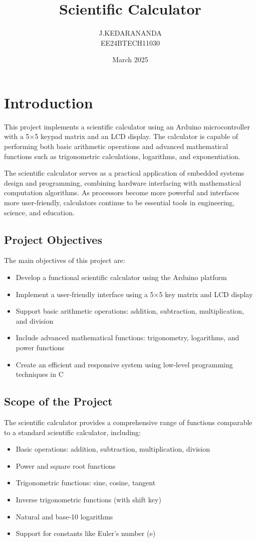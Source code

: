 \documentclass[12pt]{article}
\title{\textbf{Scientific Calculator}}
\author{J.KEDARANANDA\\EE24BTECH11030}
\date{March 2025}
\begin{document}
	
	\maketitle
	\tableofcontents
	\newpage
	
	
	\section{Introduction}
	This project implements a scientific calculator using an Arduino microcontroller with a 5×5 keypad matrix and an LCD display. The calculator is capable of performing both basic arithmetic operations and advanced mathematical functions such as trigonometric calculations, logarithms, and exponentiation.
	
	The scientific calculator serves as a practical application of embedded systems design and programming, combining hardware interfacing with mathematical computation algorithms. As processors become more powerful and interfaces more user-friendly, calculators continue to be essential tools in engineering, science, and education.
	
	\subsection{Project Objectives}
	The main objectives of this project are:
	\begin{itemize}
		\item Develop a functional scientific calculator using the Arduino platform
		\item Implement a user-friendly interface using a 5×5 key matrix and LCD display
		\item Support basic arithmetic operations: addition, subtraction, multiplication, and division
		\item Include advanced mathematical functions: trigonometry, logarithms, and power functions
		\item Create an efficient and responsive system using low-level programming techniques in C
	\end{itemize}
	
	\subsection{Scope of the Project}
	The scientific calculator provides a comprehensive range of functions comparable to a standard scientific calculator, including:
	\begin{itemize}
		\item Basic operations: addition, subtraction, multiplication, division
		\item Power and square root functions
		\item Trigonometric functions: sine, cosine, tangent
		\item Inverse trigonometric functions (with shift key)
		\item Natural and base-10 logarithms
		\item Support for constants like Euler's number (e)
	\end{itemize}
	
\end{document}
